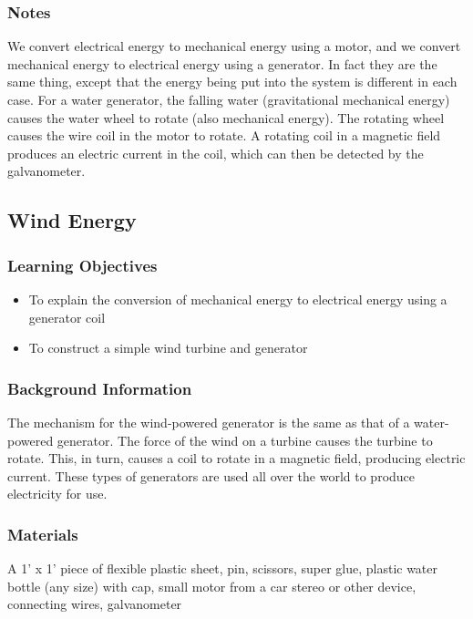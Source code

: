 \subsubsection*{Notes}
We convert electrical energy to mechanical energy using a motor, and we convert mechanical energy to electrical energy using a generator. In fact they are the same thing, except that the energy being put into the system is different in each case.  
For a water generator, the falling water (gravitational mechanical energy) causes the water wheel to rotate (also mechanical energy). The rotating wheel causes the wire coil in the motor to rotate. A rotating coil in a magnetic field produces an electric current in the coil, which can then be detected by the galvanometer.  

\subsection{Wind Energy}

\subsubsection*{Learning Objectives}
\begin{itemize}
\item{To explain the conversion of mechanical energy to electrical energy using a generator coil} 
\item{To construct a simple wind turbine and generator} 
\end{itemize}

\subsubsection*{Background Information}
The mechanism for the wind-powered generator is the same as that of a water-powered generator.  The force of the wind on a turbine causes the turbine to rotate.  This, in turn, causes a coil to rotate in a magnetic field, producing electric current.  These types of generators are used all over the world to produce electricity for use.

\subsubsection*{Materials}
A 1' x 1' piece of flexible plastic sheet, pin, scissors, super glue, plastic water bottle (any size) with cap, small motor from a car stereo or other device, connecting wires, galvanometer

